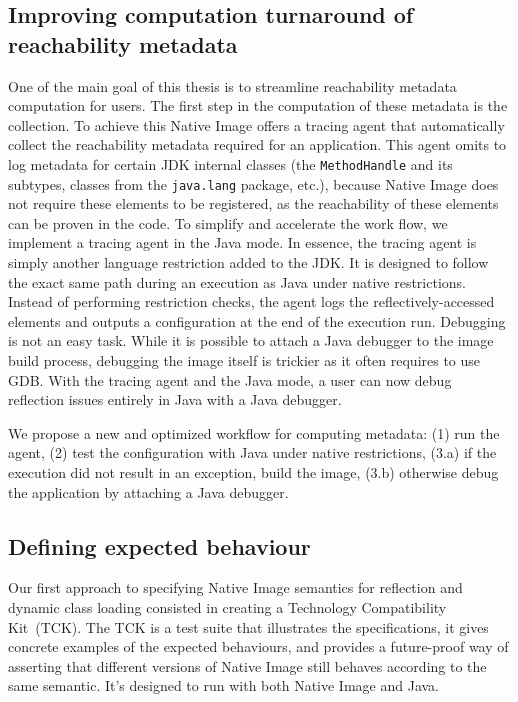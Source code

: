 \subsection{Improving computation turnaround of reachability metadata}
One of the main goal of this thesis is to streamline reachability metadata computation for users.
The first step in the computation of these metadata is the collection. To achieve this Native Image offers a tracing agent that automatically collect the reachability metadata required for an application. This agent omits to log metadata for certain JDK internal classes (the \verb|MethodHandle| and its subtypes, classes from the \verb|java.lang| package, etc.), because Native Image does not require these elements to be registered, as the reachability of these elements can be proven in the code.  
To simplify and accelerate the work flow, we implement a tracing agent in the Java mode. In essence, the tracing agent is simply another language restriction added to the JDK. It is designed to follow the exact same path during an execution as Java under native restrictions. Instead of performing restriction checks, the agent logs the reflectively-accessed elements and outputs a configuration at the end of the execution run. 
Debugging is not an easy task. While it is possible to attach a Java debugger to the image build process, debugging the image itself is trickier as it often requires to use GDB. With the tracing agent and the Java mode, a user can now debug reflection issues entirely in Java with a Java debugger. 

We propose a new and optimized workflow for computing metadata: (1) run the agent, (2) test the configuration with Java under native restrictions, (3.a) if the execution did not result in an exception, build the image, (3.b) otherwise debug the application by attaching a Java debugger.


\subsection{Defining expected behaviour}
Our first approach to specifying Native Image semantics for reflection and dynamic class loading consisted in creating a Technology Compatibility Kit~(TCK). The TCK is a test suite that illustrates the specifications, it gives concrete examples of the expected behaviours, and provides a future-proof way of asserting that different versions of Native Image still behaves according to the same semantic.
It's designed to run with both Native Image and Java.


